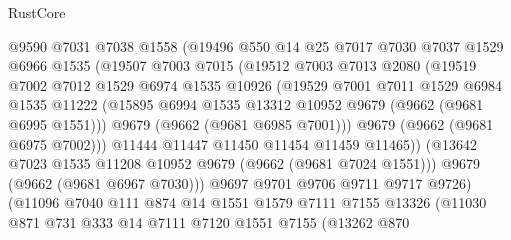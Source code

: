\begin{lexlean}{RustCore}
\begin{coremodule}
                      @9590
                      @7031
                      @7038
                      @1558
                      (@19496
                        @550
                        @14
                        @25
                        @7017
                        @7030
                        @7037
                        @1529
                        @6966
                        @1535
                        (@19507
                          @7003
                          @7015
                          (@19512
                            @7003
                            @7013
                            @2080
                            (@19519
                              @7002
                              @7012
                              @1529
                              @6974
                              @1535
                              @10926
                              (@19529
                                @7001
                                @7011
                                @1529
                                @6984
                                @1535
                                @11222
                                (@15895 @6994 @1535 @13312 @10952 @9679 (@9662 (@9681 @6995 @1551)))
                                @9679
                                (@9662 (@9681 @6985 @7001)))
                              @9679
                              (@9662 (@9681 @6975 @7002)))
                            @11444
                            @11447
                            @11450
                            @11454
                            @11459
                            @11465))
                        (@13642 @7023 @1535 @11208 @10952 @9679 (@9662 (@9681 @7024 @1551)))
                        @9679
                        (@9662 (@9681 @6967 @7030)))
                      @9697
                      @9701
                      @9706
                      @9711
                      @9717
                      @9726)
                    (@11096
                      @7040
                      @111
                      @874
                      @14
                      @1551
                      @1579
                      @7111
                      @7155
                      @13326
                      (@11030
                        @871
                        @731
                        @333
                        @14
                        @7111
                        @7120
                        @1551
                        @7155
                        (@13262
                          @870

\end{coremodule}
\end{lexlean}
